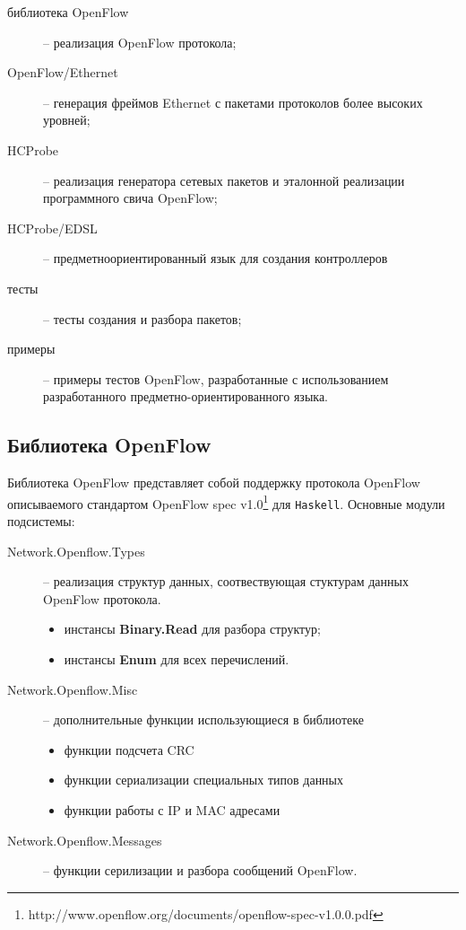 \documentclass[9pt,a4paper]{article}
\begin{document}
\begin{description}
    \item[библиотека OpenFlow] -- реализация OpenFlow протокола;
    \item[OpenFlow/Ethernet]   -- генерация фреймов Ethernet с пакетами протоколов
      более высоких уровней;
    \item[HCProbe]             -- реализация генератора сетевых пакетов и эталонной
      реализации программного свича OpenFlow;
    \item[HCProbe/EDSL]        -- предметноориентированный язык для создания контроллеров
    \item[тесты]               -- тесты создания и разбора пакетов;
    \item[примеры]             -- примеры тестов OpenFlow, разработанные с использованием
      разработанного предметно-ориентированного языка.
\end{description}


\subsection{Библиотека OpenFlow}

Библиотека OpenFlow представляет собой поддержку протокола 
OpenFlow описываемого стандартом OpenFlow spec 
v1.0\footnote{http://www.openflow.org/documents/openflow-spec-v1.0.0.pdf}
для \texttt{Haskell}. Основные модули подсистемы:

\begin{description}
    \item[Network.Openflow.Types] -- реализация структур данных, соотвествующая
        стуктурам данных OpenFlow протокола.
        \begin{itemize}
            \item инстансы \textbf{Binary.Read} для разбора структур;
            \item инстансы \textbf{Enum} для всех перечислений.
        \end{itemize}
    \item[Network.Openflow.Misc] -- дополнительные функции использующиеся в библиотеке
        \begin{itemize}
            \item функции подсчета CRC
            \item функции сериализации специальных типов данных
            \item функции работы с IP и MAC адресами
        \end{itemize}
    \item[Network.Openflow.Messages] -- функции серилизации и разбора сообщений OpenFlow.
\end{description}
\end{document}
